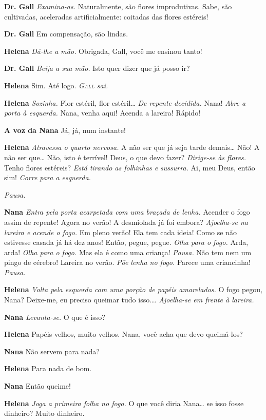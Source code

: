 \textbf{Dr. Gall} \emph{Examina-as.} Naturalmente, são flores improdutivas. Sabe, são
cultivadas, aceleradas artificialmente: coitadas das flores estéreis!

\textbf{Dr. Gall} Em compensação, são lindas.

\textbf{Helena} \emph{Dá-lhe a mão.} Obrigada, Gall, você me ensinou tanto!

\textbf{Dr. Gall} \emph{Beija a sua mão.} Isto quer dizer que já posso ir?

\textbf{Helena} Sim. Até logo.
\emph{\textsc{Gall} sai.}

\textbf{Helena} \emph{Sozinha.} Flor estéril, flor estéril\ldots{} \emph{De repente
decidida.} Nana! \emph{Abre a porta à esquerda.} Nana, venha aqui! Acenda a lareira! Rápido!

\textbf{A voz da Nana} Já, já, num instante!

\textbf{Helena} \emph{Atravessa o quarto nervosa.} A não ser que já seja tarde demais\ldots{} 
Não! A não ser que\ldots{} Não, isto é terrível! Deus, o que
devo fazer? \emph{Dirige-se às flores.} Tenho flores estéreis?
\emph{Está tirando as folhinhas e sussurra.} Ai, meu Deus, então sim!
\emph{Corre para a esquerda.}

\emph{Pausa.}

\textbf{Nana} \emph{Entra pela porta acarpetada com uma braçada de lenha.} Acender o fogo assim de repente!
Agora no verão! A desmiolada já foi embora? \emph{Ajoelha-se na lareira e
acende o fogo.} Em pleno verão! Ela tem cada ideia! Como se não estivesse casada
já há dez anos! Então, pegue, pegue. \emph{Olha para o fogo.} Arda, arda!
\emph{Olha para o fogo.} Mas ela é como uma criança! \emph{Pausa.} Não
tem nem um pingo de cérebro! Lareira no verão. \emph{Põe lenha no fogo.}
Parece uma criancinha! \emph{Pausa.}

\textbf{Helena} \emph{Volta pela esquerda com uma porção de papéis amarelados.}
O fogo pegou, Nana? Deixe-me, eu preciso queimar tudo isso.\ldots{}
\emph{Ajoelha-se em frente à lareira.}

\textbf{Nana} \emph{Levanta-se.} O que é isso?

\textbf{Helena} Papéis velhos, muito velhos. Nana, você acha que devo queimá-los?

\textbf{Nana} Não servem para nada?

\textbf{Helena} Para nada de bom.

\textbf{Nana} Então queime!

\textbf{Helena} \emph{Joga a primeira folha no fogo.} O que você diria Nana\ldots{} se
isso fosse dinheiro? Muito dinheiro.

